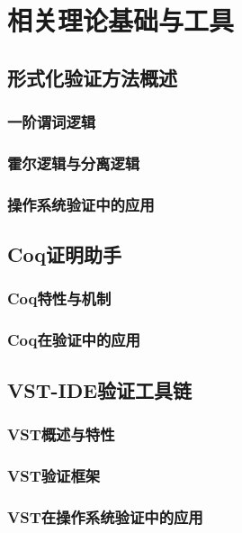 \chapter{相关理论基础与工具}
\section{形式化验证方法概述}
\subsection{一阶谓词逻辑}
\subsection{霍尔逻辑与分离逻辑}
\subsection{操作系统验证中的应用}
\section{Coq证明助手}
\subsection{Coq特性与机制}
\subsection{Coq在验证中的应用}
\section{VST-IDE验证工具链}
\subsection{VST概述与特性}
\subsection{VST验证框架}
\subsection{VST在操作系统验证中的应用}